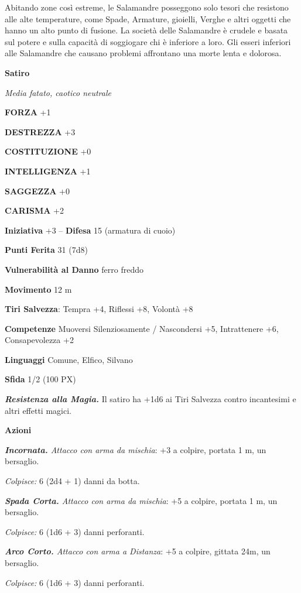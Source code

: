 \begin{multicols}{2}
Abitando zone così estreme, le Salamandre posseggono solo tesori che resistono alle alte temperature, come Spade, Armature, gioielli, Verghe e altri oggetti che hanno un alto punto di fusione. La società delle Salamandre è crudele e basata sul potere e sulla capacità di soggiogare chi è inferiore a loro. Gli esseri inferiori alle Salamandre che causano problemi affrontano una morte lenta e dolorosa.



\medskip{}\textbf{Satiro}

\textit{Media fatato, caotico neutrale}

\textbf{FORZA} +1

\textbf{DESTREZZA} +3

\textbf{COSTITUZIONE} +0

\textbf{INTELLIGENZA} +1

\textbf{SAGGEZZA} +0

\textbf{CARISMA} +2

\textbf{Iniziativa} +3 -- \textbf{Difesa} 15 (armatura di cuoio)

\textbf{Punti Ferita} 31 (7d8)

\textbf{Vulnerabilità al Danno} ferro freddo

\textbf{Movimento} 12 m

\textbf{Tiri Salvezza}: Tempra +4, Riflessi +8, Volontà +8

\textbf{Competenze} Muoversi Silenziosamente / Nascondersi +5, Intrattenere +6, Consapevolezza +2

\textbf{Linguaggi} Comune, Elfico, Silvano

\textbf{Sfida} 1/2 (100 PX)

\textit{\textbf{Resistenza alla Magia.}} Il satiro ha +1d6 ai Tiri Salvezza contro incantesimi e altri effetti magici.

\textbf{Azioni}

\textit{\textbf{Incornata.} Attacco con arma da mischia}: +3 a colpire, portata 1 m, un bersaglio.

\textit{Colpisce:} 6 (2d4 + 1) danni da botta.

\textit{\textbf{Spada Corta.} Attacco con arma da mischia}: +5 a colpire, portata 1 m, un bersaglio.

\textit{Colpisce:} 6 (1d6 + 3) danni perforanti.

\textit{\textbf{Arco Corto.} Attacco con arma a Distanza}: +5 a colpire, gittata 24m, un bersaglio.

\textit{Colpisce:} 6 (1d6 + 3) danni perforanti.


\end{multicols}
